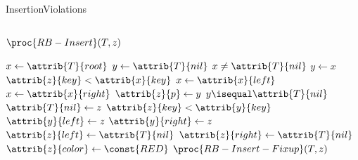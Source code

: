 \documentclass[aspectratio=1610]{beamer}
\begin{document}
\begin{frame}{Insertion}{Violations}
\begin{columns}[t]
        \scriptsize
        \begin{block}{$\proc{RB-Insert}(T,z)$}
        
            \vspace{-\abovedisplayskip}
            \begin{codebox}
                \li $x \gets \attrib{T}{root}$ 
                \li $y \gets \attrib{T}{nil}$ 
                \li \While $x \neq \attrib{T}{nil}$ 
                    \Do
                \li     $y \gets x$ 
                \li     \If $\attrib{z}{key} < \attrib{x}{key}$ 
                        \Then
                \li         $x \gets \attrib{x}{left}$
                \li     \Else $x \gets \attrib{x}{right}$ 
                        \End
                    \End
                \li $\attrib{z}{p} \gets y$ 
                \li \If $y \isequal \attrib{T}{nil}$
                    \Then
                \li     $\attrib{T}{nil} \gets z$ 
                \li \ElseIf $\attrib{z}{key} < \attrib{y}{key}$ 
                    \Then
                \li     $\attrib{y}{left} \gets z$
                \li \Else $\attrib{y}{right} \gets z$
                    \End
                \li $\attrib{z}{left}\gets \attrib{T}{nil}$
                \li $\attrib{z}{right} \gets \attrib{T}{nil}$ 
                \li $\attrib{z}{color} \gets \const{RED}$
                \li $\proc{RB-Insert-Fixup}(T,z)$
            \end{codebox}
        \end{block}
    \end{columns}
\end{frame}
\end{document}
